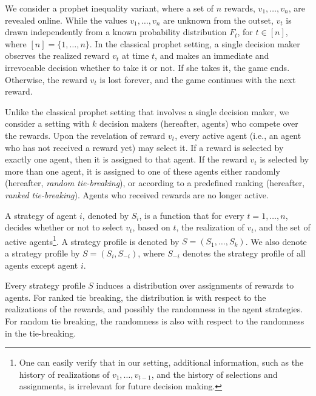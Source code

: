 We consider a prophet inequality variant, where a set of $n$ rewards, $v_1, \ldots, v_n$, are revealed online. While the values $v_1, \ldots, v_n$ are unknown from the outset, $v_t$ is drawn independently from a known probability distribution $F_t$, for $t\in[n]$, where $[n]=\{1,\ldots,n\}$. 
In the classical prophet setting, a single decision maker observes the realized reward $v_t$ at time $t$, and makes an immediate and irrevocable decision whether to take it or not. If she takes it, the game ends. Otherwise, the reward $v_t$ is lost forever, and the game continues with the next reward.

Unlike the classical prophet setting that involves a single decision maker, we consider a setting with $k$ decision makers (hereafter, agents) who compete over the rewards. 
Upon the revelation of reward $v_t$, every active agent (i.e., an agent who has not received a reward yet) may select it.
If a reward is selected by exactly one agent, then it is assigned to that agent. 
If the reward $v_t$ is selected by more than one agent, it is assigned to one of these agents either randomly (hereafter, {\em random tie-breaking}), or according to a predefined ranking (hereafter, {\em ranked tie-breaking}).
Agents who received rewards are no longer active.


A strategy of agent $i$, denoted by $S_i$, is a function that for every $t=1, \ldots, n$, decides whether or not to select $v_t$, based on $t$, the realization of $v_t$, and the set of active agents\footnote{One can easily verify that in our setting, additional information, such as the history of realizations of $v_1, \ldots, v_{t-1}$, and the history of selections and assignments, is irrelevant for future decision making.}. 
A strategy profile is denoted by $S=(S_1,\ldots,S_k)$.
We also denote a strategy profile by $S=(S_i,S_{-i})$, where $S_{-i}$ denotes the strategy profile of all agents except agent $i$.

Every strategy profile $S$ induces a distribution over assignments of rewards to agents. 
For ranked tie breaking, the distribution is with respect to the realizations of the rewards, and possibly the randomness in the agent strategies. For random tie breaking, the randomness is also with respect to the randomness in the tie-breaking. 
 
